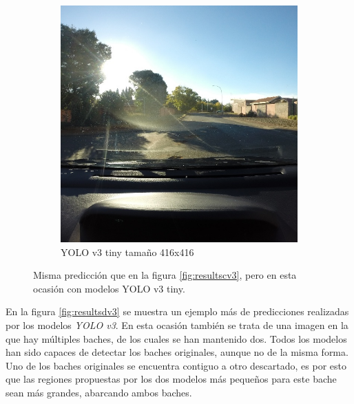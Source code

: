 \begin{figure}[H]
\begin{subfigure}[h]{0.45\linewidth}
		\includegraphics[width=\linewidth]{images/results_c_yolo_v3_tiny_416.jpg}
		\caption{YOLO v3 tiny tamaño 416x416}
	\end{subfigure}
	\caption{Misma predicción que en la figura \ref{fig:resultscv3}, pero en esta ocasión con modelos YOLO v3 tiny.}
	\label{fig:resultscv3tiny}
\end{figure}

En la figura \ref{fig:resultsdv3} se muestra un ejemplo más de predicciones realizadas por los modelos \textit{YOLO v3}. En esta ocasión también se trata de una imagen en la que hay múltiples baches, de los cuales se han mantenido dos. Todos los modelos han sido capaces de detectar los baches originales, aunque no de la misma forma. Uno de los baches originales se encuentra contiguo a otro descartado, es por esto que las regiones propuestas por los dos modelos más pequeños para este bache sean más grandes, abarcando ambos baches.

